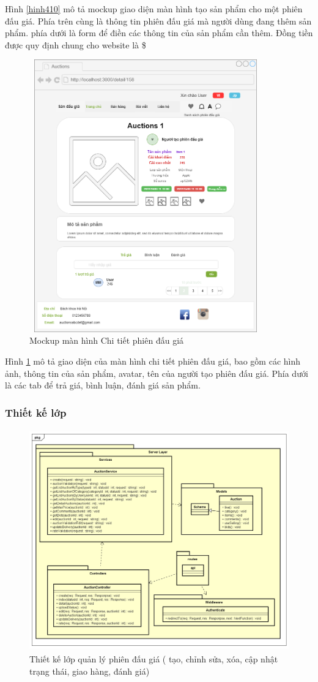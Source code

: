 \documentclass{article}
\begin{document}
Hình \ref{hinh410} mô tả mockup giao diện màn hình tạo sản phẩm cho một phiên đấu giá. Phía trên cùng là thông tin phiên đấu giá mà người dùng đang thêm sản phẩm. phía dưới là form để điền các thông tin của sản phẩm cần thêm. Đồng tiền được quy định chung cho website là \$
\begin{figure}[H]
    \centering
    \includegraphics[width=10.04cm,height=11.76cm]{images/detailitem.png}
    \caption{Mockup màn hình Chi tiết phiên đấu giá}
    \label{hinh411}
\end{figure}
Hình \ref{hinh411} mô tả giao diện của màn hình chi tiết phiên đấu giá, bao gồm các hình ảnh, thông tin của sản phẩm, avatar, tên của người tạo phiên đấu giá. Phía dưới là các tab để trả giá, bình luận, đánh giá sản phẩm. 
\subsubsection{Thiết kế lớp}
\begin{figure}[H]
    \centering
    \includegraphics[width=11.4cm,height=9.54cm]{images/detailclass.png}
    \caption{Thiết kế lớp quản lý phiên đấu giá ( tạo, chỉnh sửa, xóa, cập nhật trạng thái, giao hàng, đánh giá)}
    \label{hinh412}
\end{figure}
\newpage
\end{document}
